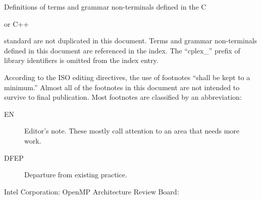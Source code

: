 \documentclass[
	techspec,	%
	final,		%
	notcopyright,	%
	letterpaper	%
	]{isov2}
\begin{document}
\pnum
Definitions of terms and grammar non-terminals defined in the C
\begin{cpp}
or C++
\end{cpp}
standard are not duplicated in this document.
Terms and grammar non-terminals defined in this document
are referenced in the index.
The ``cplex_'' prefix of library identifiers
is omitted from the index entry.

\pnum
According to the ISO editing directives,
the use of footnotes
``shall be kept to a minimum.''
Almost all of the footnotes in this document
are not intended to survive to final publication.
Most footnotes are classified by an abbreviation:
\begin{description}
\item[EN]
Editor's note.
These mostly call attention to an area that needs more work.
\item[DFEP]
Departure from existing practice.
\end{description}

\begin{comment}
\pnum
Annex A contains information
concerning the editing of the LaTeX source of this document.
It will not survive to final publication.
\end{comment}












\bibannex
\begin{references}
{Intel Corporation}:
{OpenMP Architecture Review Board}:
\end{references}

\twocolumn %
\printindex
\end{document}
